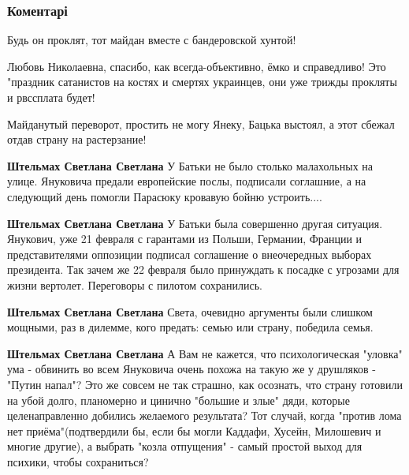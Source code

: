  
 
 
 
 
\subsubsection{Коментарі}

\begin{itemize} %
Будь он проклят, тот майдан вместе с бандеровской хунтой!


Любовь Николаевна, спасибо, как всегда-объективно, ёмко и справедливо! Это
"праздник сатанистов на костях и смертях украинцев, они уже трижды прокляты и
рвссплата будет!

Майданутый переворот, простить не могу Янеку, Бацька выстоял, а этот сбежал отдав страну на растерзание!

\begin{itemize} %
\textbf{Штельмах Светлана Светлана} У Батьки не было столько малахольных на улице. Януковича предали европейские послы, подписали соглашние, а на следующий день помогли Парасюку кровавую бойню устроить....

\textbf{Штельмах Светлана Светлана} У Батьки была совершенно другая ситуация. Янукович, уже 21 февраля с гарантами из Польши, Германии, Франции и представителями оппозиции подписал соглашение о внеочередных выборах президента. Так зачем же 22 февраля было принуждать к посадке с угрозами для жизни вертолет. Переговоры с пилотом сохранились.


\textbf{Штельмах Светлана Светлана} Света, очевидно аргументы были слишком мощными, раз в дилемме, кого предать: семью или страну, победила семья.

\textbf{Штельмах Светлана Светлана} А Вам не кажется, что психологическая "уловка" ума - обвинить во всем Януковича очень похожа на такую же у друшляков - "Путин напал"? Это же совсем не так страшно, как осознать, что страну готовили на убой долго, планомерно и цинично "большие и злые" дяди, которые целенаправленно добились желаемого результата? Тот случай, когда "против лома нет приёма"(подтвердили бы, если бы могли Каддафи, Хусейн, Милошевич и многие другие), а выбрать "козла отпущения" - самый простой выход для психики, чтобы сохраниться?


\end{itemize}
\end{itemize}
